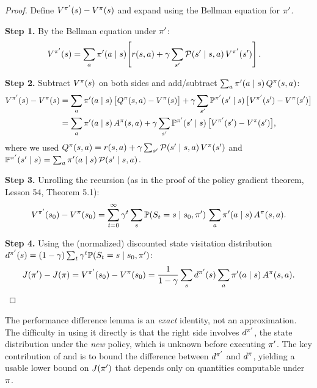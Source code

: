\documentclass[11pt,a4paper]{article}
\begin{document}
\begin{proof}
Define $V^{\pi'}(s) - V^{\pi}(s)$ and expand using the Bellman
equation for $\pi'$.

\textbf{Step 1.} By the Bellman equation under $\pi'$:
\begin{align*}
  V^{\pi'}(s) &= \sum_a \pi'(a \mid s)\!\left[r(s,a) +
    \gamma \sum_{s'} \mathcal{P}(s' \mid s,a)\, V^{\pi'}(s')\right].
\end{align*}

\textbf{Step 2.} Subtract $V^\pi(s)$ on both sides and add/subtract
$\sum_a \pi'(a \mid s)\, Q^\pi(s,a)$:
\begin{align*}
  V^{\pi'}(s) - V^\pi(s)
  &= \sum_a \pi'(a \mid s)\, \bigl[Q^\pi(s,a) - V^\pi(s)\bigr]
    + \gamma \sum_{s'} \mathbb{P}^{\pi'}(s' \mid s)\,
    \bigl[V^{\pi'}(s') - V^\pi(s')\bigr] \\
  &= \sum_a \pi'(a \mid s)\, A^\pi(s,a)
    + \gamma \sum_{s'} \mathbb{P}^{\pi'}(s' \mid s)\,
    \bigl[V^{\pi'}(s') - V^\pi(s')\bigr],
\end{align*}
where we used $Q^\pi(s,a) = r(s,a) + \gamma \sum_{s'}
\mathcal{P}(s' \mid s,a)\, V^\pi(s')$ and $\mathbb{P}^{\pi'}(s' \mid s)
= \sum_a \pi'(a \mid s)\, \mathcal{P}(s' \mid s,a)$.

\textbf{Step 3.} Unrolling the recursion (as in the proof of the
policy gradient theorem, Lesson 54, Theorem 5.1):
\[
  V^{\pi'}(s_0) - V^\pi(s_0) = \sum_{t=0}^{\infty} \gamma^t
  \sum_s \mathbb{P}(S_t = s \mid s_0, \pi')\, \sum_a \pi'(a \mid s)\,
  A^\pi(s,a).
\]

\textbf{Step 4.} Using the (normalized) discounted state visitation
distribution $d^{\pi'}(s) = (1-\gamma) \sum_t \gamma^t
\mathbb{P}(S_t = s \mid s_0, \pi')$:
\[
  J(\pi') - J(\pi) = V^{\pi'}(s_0) - V^\pi(s_0)
  = \frac{1}{1-\gamma} \sum_s d^{\pi'}(s) \sum_a
  \pi'(a \mid s)\, A^\pi(s,a). \qedhere
\]
\end{proof}

\begin{remark}
\label{rem:pdl-exact}
The performance difference lemma is an \emph{exact} identity, not an
approximation. The difficulty in using it directly is that the right
side involves $d^{\pi'}$, the state distribution under the
\emph{new} policy, which is unknown before executing $\pi'$.
The key contribution of \citet{kakade2002cpi} and
\citet{schulman2015trpo} is to bound the difference between
$d^{\pi'}$ and $d^{\pi}$, yielding a usable lower bound
on $J(\pi')$ that depends only on quantities computable under
$\pi$.
\end{remark}
\end{document}
